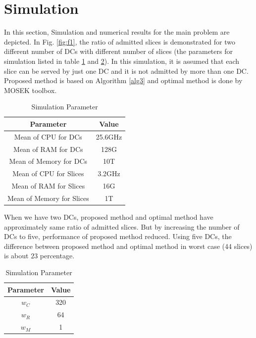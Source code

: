 \documentclass[conference]{IEEEtran}
\begin{document}
\section{Simulation}
In this section, Simulation and numerical results for the main problem are depicted.
In Fig. \ref{fig:f1}, the ratio of admitted slices is demonstrated for two different number of DCs with different number of slices (the parameters for simulation listed in table \ref{table:1} and \ref{table:2}). In this simulation, it is assumed that each slice can be served by just one DC and it is not admitted by more than one DC. Proposed method is based on Algorithm \ref{alg3} and optimal method is done by MOSEK toolbox.
 \begin{table}
 \caption {Simulation Parameter} \label{table:1} 
 \begin{center}
  \begin{tabular}{||c c ||} 
  \hline
  Parameter & Value \\ [0.5ex] 
  \hline\hline
  Mean of CPU for DCs & 25.6GHz\\
  \hline
  Mean of RAM for DCs & 128G\\
  \hline
 Mean of Memory for DCs & 10T \\
  \hline
   Mean of CPU for Slices & 3.2GHz\\
  \hline
  Mean of RAM for Slices & 16G\\
  \hline
 Mean of Memory for Slices & 1T \\ [1ex] 
  \hline
 \end{tabular}
 \end{center}
 \end{table}
When we have two DCs, proposed method and optimal method have approximately same ratio of admitted slices. But by increasing the number of DCs to five, performance of proposed method reduced. Using five DCs, the difference between 
proposed method and optimal method in worst case (44 slices) is about $23$ percentage. 
 \begin{table}
 \caption {Simulation Parameter} \label{table:2} 
 \begin{center}
  \begin{tabular}{||c c ||} 
  \hline
  Parameter & Value \\ [0.5ex] 
  \hline\hline
   $w_C$ & 320\\
  \hline
  $w_R$  & 64\\
  \hline
 $w_M$  & 1 \\ [1ex] 
  \hline
 \end{tabular}
 \end{center}
 \end{table}
\end{document}
